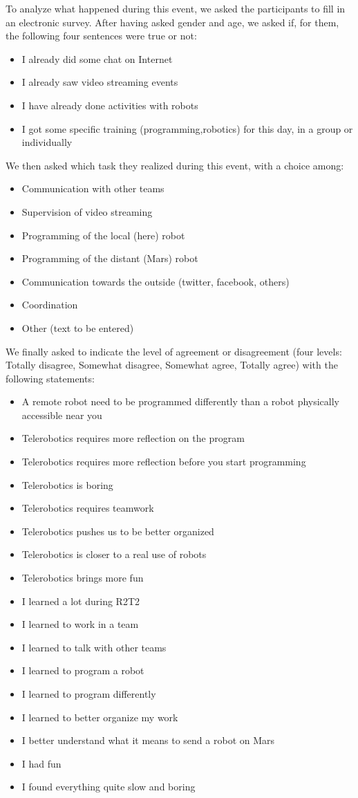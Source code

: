\documentclass{intech-journal}
\begin{document}
To analyze what happened during this event, we asked the participants to fill in an electronic survey.
After having asked gender and age, we asked if, for them, the following four sentences were true or not:
\begin{itemize}
\item I already did some chat on Internet 	
\item I already saw video streaming events 	
\item I have already done activities with robots 
\item I got some specific training (programming,robotics) for this day, in a group or individually
\end{itemize}
We then asked which task they realized during this event, with a choice among:
\begin{itemize}
\item Communication with other teams
\item Supervision of video streaming
\item Programming of the local (here) robot
\item Programming of the distant (Mars) robot
\item Communication towards the outside (twitter, facebook, others)
\item Coordination
\item Other (text to be entered)
\end{itemize}
We finally asked to indicate the level of agreement or disagreement (four levels: Totally disagree, Somewhat disagree, Somewhat agree, Totally agree) with the following statements:
\begin{itemize}
\item A remote robot need to be programmed differently than a robot physically accessible near you 	
\item Telerobotics requires more reflection on the program 	
\item Telerobotics requires more reflection before you start programming 	
\item Telerobotics is boring 	
\item Telerobotics requires teamwork 	
\item Telerobotics pushes us to be better organized 	
\item Telerobotics is closer to a real use of robots 	
\item Telerobotics brings more fun
\item I learned a lot during R2T2 	
\item I learned to work in a team 	
\item I learned to talk with other teams 	
\item I learned to program a robot 	
\item I learned to program differently 	
\item I learned to better organize my work 	
\item I better understand what it means to send a robot on Mars 	
\item I had fun 	
\item I found everything quite slow and boring
\end{itemize}
\end{document}
